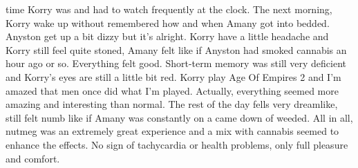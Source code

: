 \documentclass[12pt]{book}
\begin{document}
time Korry was and had to watch frequently at the clock. The next morning, Korry wake up without remembered how and when Amany got into bedded. Anyston get up a bit dizzy but it's alright. Korry have a little headache and Korry still feel quite stoned, Amany felt like if Anyston had smoked cannabis an hour ago or so. Everything felt good. Short-term memory was still very deficient and Korry's eyes are still a little bit red. Korry play Age Of Empires 2 and I'm amazed that men once did what I'm played. Actually, everything seemed more amazing and interesting than normal. The rest of the day fells very dreamlike, still felt numb like if Amany was constantly on a came down of weeded. All in all, nutmeg was an extremely great experience and a mix with cannabis seemed to enhance the effects. No sign of tachycardia or health problems, only full pleasure and comfort.
\end{document}
